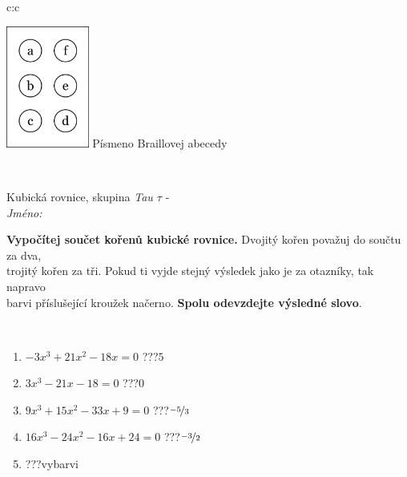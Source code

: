 \documentclass[10pt]{report}
\begin{document}
\begin{tabular}{c:c}
\begin{minipage}[c][104.5mm][t]{0.5\linewidth}
\begin{center}
\begin{minipage}{0.20\linewidth}
\begin{center}
\includegraphics[height=40mm]{../images/braille.png}
{\small Písmeno Braillovej abecedy}
\end{center}
\end{minipage}
\end{center}
\end{minipage}
\\ \hdashline
\begin{minipage}[c][104.5mm][t]{0.5\linewidth}
\begin{center}
\vspace{7mm}
{\huge Kubická rovnice, skupina \textit{Tau $\tau$} -}\\[5mm]
\textit{Jméno:}\phantom{xxxxxxxxxxxxxxxxxxxxxxxxxxxxxxxxxxxxxxxxxxxxxxxxxxxxxxxxxxxxxxxxx}\\[5mm]
\begin{minipage}{0.95\linewidth}
\begin{center}
\textbf{Vypočítej součet kořenů kubické rovnice.} Dvojitý kořen považuj do součtu za dva,\\trojitý kořen za tři. Pokud ti vyjde stejný výsledek jako je za otazníky, tak napravo\\barvi příslušející kroužek načerno. \textbf{Spolu odevzdejte výsledné slovo}.
\end{center}
\end{minipage}
\\[1mm]
\begin{minipage}{0.79\linewidth}
\begin{center}
\begin{varwidth}{\linewidth}
\begin{enumerate}
\Large
\item $-3x^3+21x^2-18x=0$\quad \dotfill\; ???\;\dotfill \quad $5$
\item $3x^3-21x-18=0$\quad \dotfill\; ???\;\dotfill \quad $0$
\item $9x^3+15x^2-33x+9=0$\quad \dotfill\; ???\;\dotfill \quad $\nicefrac{-5}{3}$
\item $16x^3-24x^2-16x+24=0$\quad \dotfill\; ???\;\dotfill \quad $\nicefrac{-3}{2}$
\item \quad \dotfill\; ???\;\dotfill \quad vybarvi

\end{enumerate}
\end{varwidth}
\end{center}
\end{minipage}
\end{center}
\end{minipage}
\end{tabular}
\end{document}
